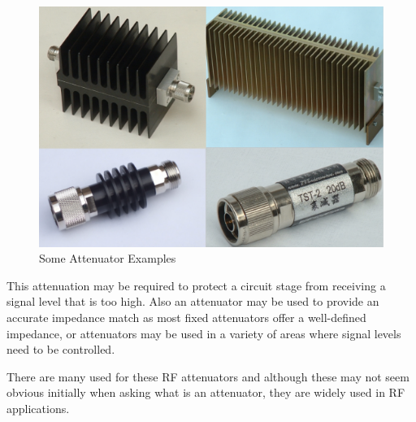 \begin{figure}[H]
	\center
	\setlength{\unitlength}{\textwidth} 
	\includegraphics[width=0.75\unitlength]{attn}
	\caption{\label{fig:attn}Some Attenuator Examples }
\end{figure}

	This attenuation may be required to protect a circuit stage from receiving a signal level that is too high. Also an attenuator may be used to provide an accurate impedance match as most fixed attenuators offer a well-defined impedance, or attenuators may be used in a variety of areas where signal levels need to be controlled.

	There are many used for these RF attenuators and although these may not seem obvious initially when asking what is an attenuator, they are widely used in RF applications.




